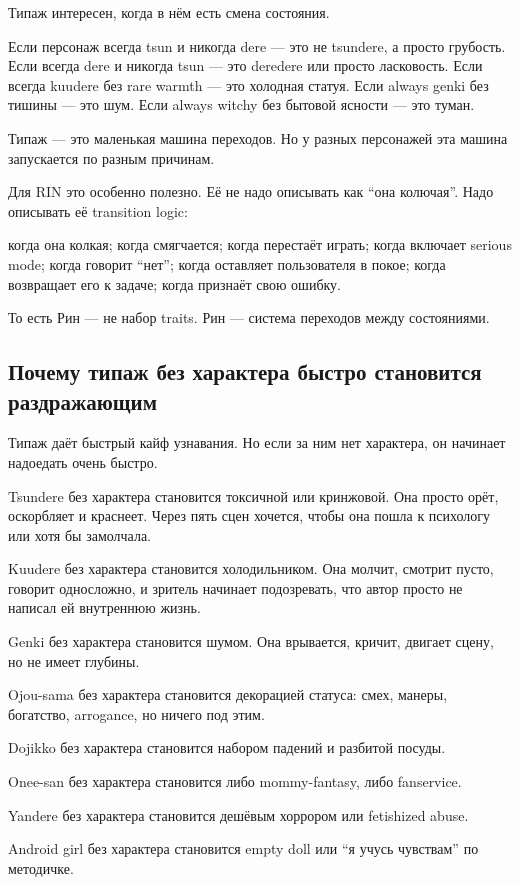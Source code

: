 Типаж интересен, когда в нём есть смена состояния.

Если персонаж всегда tsun и никогда dere --- это не tsundere, а просто
грубость. Если всегда dere и никогда tsun --- это deredere или просто
ласковость. Если всегда kuudere без rare warmth --- это холодная статуя.
Если always genki без тишины --- это шум. Если always witchy без бытовой
ясности --- это туман.

Типаж --- это маленькая машина переходов. Но у разных персонажей эта
машина запускается по разным причинам.

Для RIN это особенно полезно. Её не надо описывать как ``она колючая''.
Надо описывать её transition logic:

когда она колкая; когда смягчается; когда перестаёт играть; когда
включает serious mode; когда говорит ``нет''; когда оставляет
пользователя в покое; когда возвращает его к задаче; когда признаёт свою
ошибку.

То есть Рин --- не набор traits. Рин --- система переходов между
состояниями.

\subsection*{Почему типаж без характера быстро становится раздражающим}

Типаж даёт быстрый кайф узнавания. Но если за ним нет характера, он
начинает надоедать очень быстро.

Tsundere без характера становится токсичной или кринжовой. Она просто
орёт, оскорбляет и краснеет. Через пять сцен хочется, чтобы она пошла к
психологу или хотя бы замолчала.

Kuudere без характера становится холодильником. Она молчит, смотрит
пусто, говорит односложно, и зритель начинает подозревать, что автор
просто не написал ей внутреннюю жизнь.

Genki без характера становится шумом. Она врывается, кричит, двигает
сцену, но не имеет глубины.

Ojou-sama без характера становится декорацией статуса: смех, манеры,
богатство, arrogance, но ничего под этим.

Dojikko без характера становится набором падений и разбитой посуды.

Onee-san без характера становится либо mommy-fantasy, либо fanservice.

Yandere без характера становится дешёвым хоррором или fetishized abuse.

Android girl без характера становится empty doll или ``я учусь
чувствам'' по методичке.

